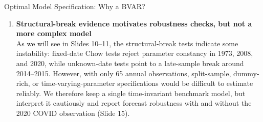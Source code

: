 \documentclass[9pt]{beamer}
\begin{document}
\begin{frame}{Optimal Model Specification: Why a BVAR?}
\begin{enumerate}
  \item \textbf{Structural-break evidence motivates robustness checks, but not a more complex model}\\
        As we will see in Slides 10–11, the structural-break tests indicate some instability: fixed-date Chow tests reject parameter constancy in 1973, 2008, and 2020, while unknown-date tests point to a late-sample break around 2014–2015. However, with only 65 annual observations, split-sample, dummy-rich, or time-varying-parameter specifications would be difficult to estimate reliably. We therefore keep a single time-invariant benchmark model, but interpret it cautiously and report forecast robustness with and without the 2020 COVID observation (Slide 15).
\end{enumerate}

\end{frame}
\end{document}
